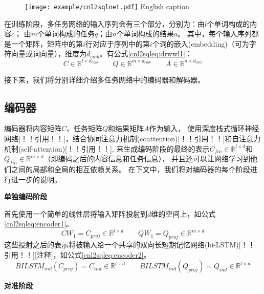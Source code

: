 \begin{figure}[!htp]
  \centering
  \texttt{[image: example/cnl2sqlnet.pdf]}
    {English caption}
  \label{fig:cnl2sqlnet}
\end{figure}

在训练阶段，多任务网络的输入序列会有三个部分，分别为：由$l$个单词构成的内容$c$；
由$m$个单词构成的任务$q$；由$n$个单词构成的结果$a$。
其中，每个输入序列都是一个矩阵，矩阵中的第$i$行对应于序列中的第$i$个词的嵌入(embedding)（可为字符向量或词向量），维度为$d_{emb}$。有公式\ref{cnl2sqleq:drwwl1}：
\begin{equation}
    \label{cnl2sqleq:drwwl1}
    C \in \mathbb{R}^{l \times d_{emb}} \qquad Q \in \mathbb{R}^{m \times d_{emb}} \qquad A \in \mathbb{R}^{n \times d_{emb}}
  \end{equation}

接下来，我们将分别详细介绍多任务网络中的编码器和解码器。

\subsection{编码器}
\label{cnl2sql:encoder}

编码器将内容矩阵$C$、任务矩阵$Q$和结果矩阵$A$作为输入，
使用深度栈式循环神经网络[！！引用！！]，结合协同注意力机制(coattention)[！！引用！！]和自注意力机制(self-attention)[！！引用！！],
来生成编码阶段的最终的表示$C_{fin} \in \mathbb{R}^{l \times d}$和$Q_{fin} \in \mathbb{R}^{m \times d}$（即编码之后的内容信息和任务信息），
并且还可以让网络学习到他们之间的局部和全局的相互依赖关系。
在下文中，我们将对编码器的每个阶段进行进一步的说明。

\textbf{单独编码阶段}

首先使用一个简单的线性层将输入矩阵投射到$d$维的空间上，如公式\ref{cnl2sqleq:encoder1}。
\begin{equation}
    \label{cnl2sqleq:encoder1}
    CW_1 = C_{proj} \in \mathbb{R}^{l \times d} \qquad QW_1 = Q_{proj} \in \mathbb{R}^{m \times d} 
  \end{equation}
这些投射之后的表示将被输入给一个共享的双向长短期记忆网络(bi-LSTM)[！！引用！！][注释]，如公式\ref{cnl2sqleq:encoder2}。
\begin{equation}
    \label{cnl2sqleq:encoder2}
    BILSTM_{ind}(C_{proj}) = C_{ind} \in \mathbb{R}^{l \times d} \qquad BILSTM_{ind}(Q_{proj}) = Q_{ind} \in \mathbb{R}^{l \times d}
\end{equation}

\textbf{对准阶段}


